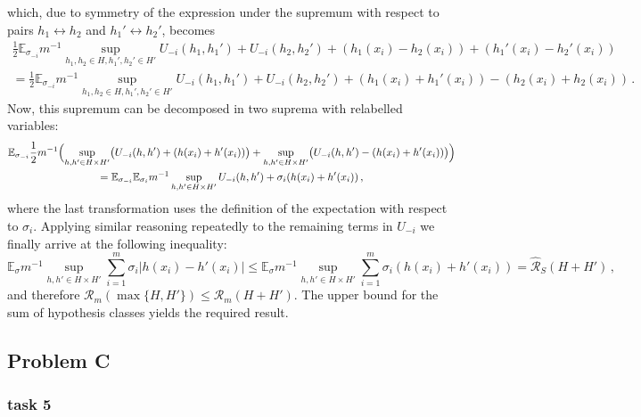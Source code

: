 \documentclass[a4paper]{article}
\newcommand{\ex}{\mathbb{E}}
\begin{document}
which, due to symmetry of the expression under the supremum with respect to pairs
$h_1 \leftrightarrow h_2$ and $h_1' \leftrightarrow h_2'$, becomes
\begin{multline*}
  \frac{1}{2} \ex_{\sigma_{-i}} m^{-1}
      \sup_{h_1, h_2\in H, h_1', h_2'\in H'}
        U_{-i}(h_1,h_1') + U_{-i}(h_2,h_2')
        + (h_1(x_i) - h_2(x_i)) + (h_1'(x_i) - h_2'(x_i)) \\
  = \frac{1}{2} \ex_{\sigma_{-i}} m^{-1}
      \sup_{h_1, h_2\in H, h_1', h_2'\in H'}
        U_{-i}(h_1,h_1') + U_{-i}(h_2,h_2')
        + (h_1(x_i) + h_1'(x_i)) - (h_2(x_i) + h_2(x_i)) \,.
\end{multline*}
Now, this supremum can be decomposed in two suprema with relabelled variables:
\begin{multline*}
  \ex_{\sigma_{-i}} \frac{1}{2} m^{-1} \Bigl(
      \sup_{h, h'\in H\times H'} \bigl(U_{-i}(h,h') + (h(x_i) + h'(x_i))\bigr)
      + \sup_{h, h'\in H\times H'} \bigl(U_{-i}(h,h') - (h(x_i) + h'(x_i))\bigr)
    \Bigr) \\
    = \ex_{\sigma_{-i}} \ex_{\sigma_i} m^{-1}
      \sup_{h, h'\in H\times H'} U_{-i}(h,h') + \sigma_i (h(x_i) + h'(x_i)) \,,
\end{multline*}
where the last transformation uses the definition of the expectation with respect
to $\sigma_i$. Applying similar reasoning repeatedly to the remaining terms in $U_{-i}$
we finally arrive at the following inequality:
\begin{equation*}
  \ex_\sigma m^{-1} \sup_{h, h'\in H\times H'} \sum_{i=1}^m \sigma_i |h(x_i) - h'(x_i)|
    \leq \ex_\sigma m^{-1} \sup_{h, h'\in H\times H'} \sum_{i=1}^m \sigma_i (h(x_i) + h'(x_i))
    = \hat{\mathcal{R}}_S(H+H')
    \,,
\end{equation*}
and therefore $\mathcal{R}_m(\max\{H,H'\}) \leq \mathcal{R}_m(H+H')$. The upper bound
for the sum of hypothesis classes yields the required result.




\subsection{Problem C} %
\label{sub:problem_c}

\subsubsection{task 5} %
\label{ssub:task_5}
\end{document}
